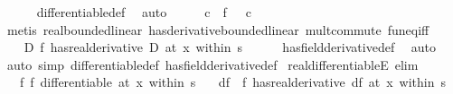 \begin{isabellebody}
\ \ \ \ \isamarkupfalse%
\ differentiable{\isacharunderscore}{\kern0pt}def\ \isamarkupfalse%
\ auto\isanewline
\ \ \isamarkupfalse%
\ \isamarkupfalse%
\ c\ \ {\isachardoublequoteopen}f{\isacharprime}{\kern0pt}\ {\isacharequal}{\kern0pt}\ {\isacharparenleft}{\kern0pt}{\isacharparenleft}{\kern0pt}{\isacharasterisk}{\kern0pt}{\isacharparenright}{\kern0pt}\ c{\isacharparenright}{\kern0pt}{\isachardoublequoteclose}\isanewline
\ \ \ \ \isamarkupfalse%
\ {\isacharparenleft}{\kern0pt}metis\ real{\isacharunderscore}{\kern0pt}bounded{\isacharunderscore}{\kern0pt}linear\ has{\isacharunderscore}{\kern0pt}derivative{\isacharunderscore}{\kern0pt}bounded{\isacharunderscore}{\kern0pt}linear\ mult{\isachardot}{\kern0pt}commute\ fun{\isacharunderscore}{\kern0pt}eq{\isacharunderscore}{\kern0pt}iff{\isacharparenright}{\kern0pt}\isanewline
\ \ \isamarkupfalse%
\ {\isacharasterisk}{\kern0pt}\ \isamarkupfalse%
\ {\isachardoublequoteopen}{\isasymexists}D{\isachardot}{\kern0pt}\ {\isacharparenleft}{\kern0pt}f\ has{\isacharunderscore}{\kern0pt}real{\isacharunderscore}{\kern0pt}derivative\ D{\isacharparenright}{\kern0pt}\ {\isacharparenleft}{\kern0pt}at\ x\ within\ s{\isacharparenright}{\kern0pt}{\isachardoublequoteclose}\isanewline
\ \ \ \ \isamarkupfalse%
\ has{\isacharunderscore}{\kern0pt}field{\isacharunderscore}{\kern0pt}derivative{\isacharunderscore}{\kern0pt}def\ \isamarkupfalse%
\ auto\isanewline
{}\isamarkupfalse%
\ {\isacharparenleft}{\kern0pt}auto\ simp{\isacharcolon}{\kern0pt}\ differentiable{\isacharunderscore}{\kern0pt}def\ has{\isacharunderscore}{\kern0pt}field{\isacharunderscore}{\kern0pt}derivative{\isacharunderscore}{\kern0pt}def{\isacharparenright}{\kern0pt}%
\endisatagproof
{\isafoldproof}%
%
\isadelimproof
\isanewline
%
\endisadelimproof
\isanewline
{}\isamarkupfalse%
\ real{\isacharunderscore}{\kern0pt}differentiableE\ {\isacharbrackleft}{\kern0pt}elim{\isacharquery}{\kern0pt}{\isacharbrackright}{\kern0pt}{\isacharcolon}{\kern0pt}\isanewline
\ \ \ f{\isacharcolon}{\kern0pt}\ {\isachardoublequoteopen}f\ differentiable\ {\isacharparenleft}{\kern0pt}at\ x\ within\ s{\isacharparenright}{\kern0pt}{\isachardoublequoteclose}\isanewline
\ \ \ df\ \ {\isachardoublequoteopen}{\isacharparenleft}{\kern0pt}f\ has{\isacharunderscore}{\kern0pt}real{\isacharunderscore}{\kern0pt}derivative\ df{\isacharparenright}{\kern0pt}\ {\isacharparenleft}{\kern0pt}at\ x\ within\ s{\isacharparenright}{\kern0pt}{\isachardoublequoteclose}\isanewline

\end{isabellebody}

